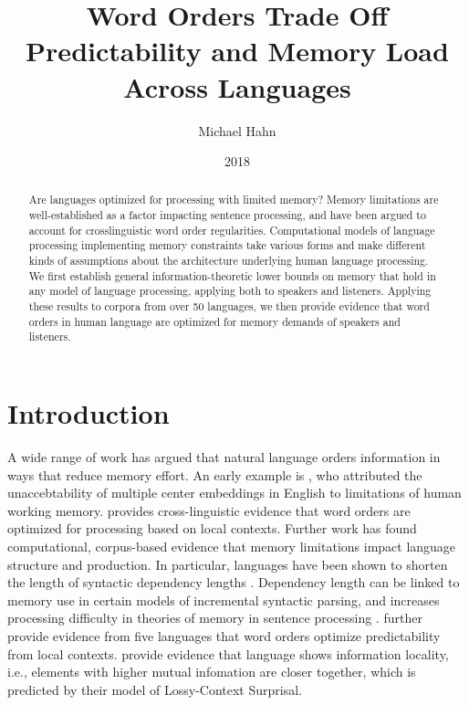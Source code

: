 \documentclass[11pt,letterpaper]{article}
\title{Word Orders Trade Off Predictability and Memory Load Across Languages}%
\author{Michael Hahn}
\date{2018}
\newcounter{theorem}
\newtheorem{thm}[theorem]{Theorem}
\begin{document}
\maketitle


%
\begin{abstract}

Are languages optimized for processing with limited memory?
Memory limitations are well-established as a factor impacting sentence processing, and have been argued to account for crosslinguistic word order regularities.
Computational models of language processing implementing memory constraints take various forms and make different kinds of assumptions about the architecture underlying human language processing.
We first  establish general information-theoretic lower bounds on memory that hold in any model of language processing, applying both to speakers and listeners. %
Applying these results to corpora from over 50 languages, we then provide evidence that word orders in human language are optimized for memory demands of speakers and listeners. %
\end{abstract}


%
%
%


\section{Introduction}

A wide range of work has argued that natural language orders information in ways that reduce memory effort.
An early example is \cite{miller-finitary-1963}, who attributed the unaccebtability of multiple center embeddings in English to limitations of human working memory.
\cite{hawkins-efficiency-2003} provides cross-linguistic evidence that word orders are optimized for processing based on local contexts.
Further work has found computational, corpus-based evidence that memory limitations impact language structure and production.
In particular, languages have been shown to shorten the length of syntactic dependency lengths \citep{futrell-large-scale-2015}.
Dependency length can be linked to memory use in certain models of incremental syntactic parsing, and increases processing difficulty in theories of memory in sentence processing \citep{gibson-linguistic-1998}.
\cite{gildea-human-2015} further provide evidence from five languages that word orders optimize predictability from local contexts.
\cite{futrell-noisy-context-2017} provide evidence that language shows information locality, i.e., elements with higher mutual infomation are closer together, which is predicted by their model of Lossy-Context Surprisal.
\end{document}

